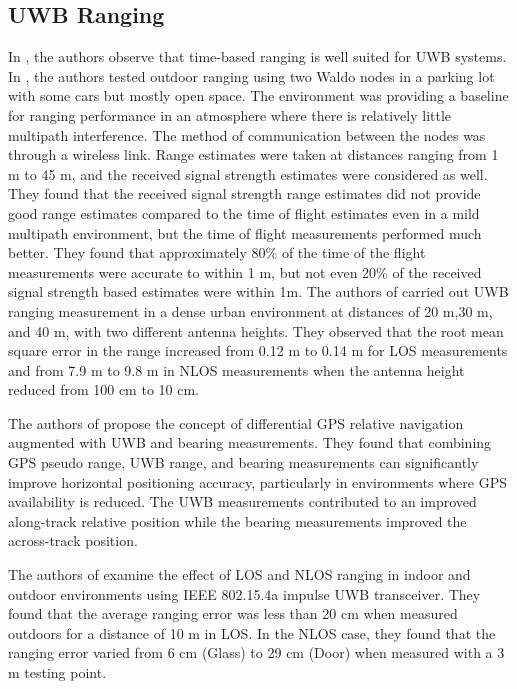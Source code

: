 \subsection{UWB Ranging}

In \cite{soganci2011accurate}, the authors observe that time-based ranging is well suited for UWB systems. In \cite{lanzisera2009rf}, the authors tested outdoor ranging using two Waldo nodes in a parking lot with some cars but mostly open space. The environment was providing a baseline for ranging performance in an atmosphere where there is relatively little multipath interference. The method of communication between the nodes was through a wireless link. Range estimates were taken at distances ranging from 1 m to 45 m, and the received signal strength estimates were considered as well. They found that the received signal strength range estimates did not provide good range estimates compared to the time of flight estimates even in a mild multipath environment, but the time of flight measurements performed much better. They found that approximately 80\% of the time of the flight measurements were accurate to within 1 m, but not even 20\% of the received signal strength based estimates were within 1m. The authors of \cite{kristem2014experimental} carried out UWB ranging measurement in a dense urban environment at distances of 20 m,30 m, and 40 m, with two different antenna heights. They observed that the root mean square error in the range increased from 0.12 m to 0.14 m for LOS measurements and from 7.9 m to 9.8 m in NLOS measurements when the antenna height reduced from 100 cm to 10 cm.

The authors of \cite{petovello2012demonstration} propose the concept of differential GPS relative navigation augmented with UWB and bearing measurements. They found that combining GPS pseudo range, UWB range, and bearing measurements can significantly improve horizontal positioning accuracy, particularly in environments where GPS availability is reduced. The UWB measurements contributed to an improved along-track relative position while the bearing measurements improved the across-track position. 

The authors of \cite{ye2011experimental} examine the effect of LOS and NLOS ranging in indoor and outdoor environments using IEEE 802.15.4a impulse UWB transceiver. They found that the average ranging error was less than 20 cm when measured outdoors for a distance of 10 m in LOS. In the NLOS case, they found that the ranging error varied from 6 cm (Glass) to 29 cm (Door) when measured with a 3 m testing point.

